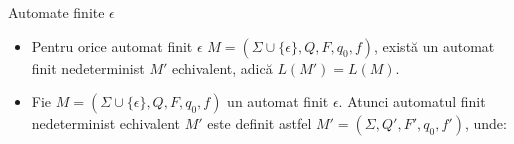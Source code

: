 \documentclass[pdf]{beamer}
\begin{document}
\begin{frame}{Automate finite $\epsilon$}
\begin{itemize}
\item
Pentru orice automat finit $\epsilon$ $M=(\Sigma \cup \{ \epsilon \}, Q, F, q_{0}, f)$, există un automat finit nedeterminist $M'$ echivalent, adică $L(M') = L(M).$

\item
Fie $M=(\Sigma \cup \{ \epsilon \}, Q, F, q_{0}, f)$ un automat finit $\epsilon$. Atunci automatul finit nedeterminist echivalent $M'$ este definit astfel $M'=(\Sigma, Q', F', q_{0}, f')$, unde:

\begin{center}
\end{center}
\end{itemize}
\end{frame}
\end{document}
